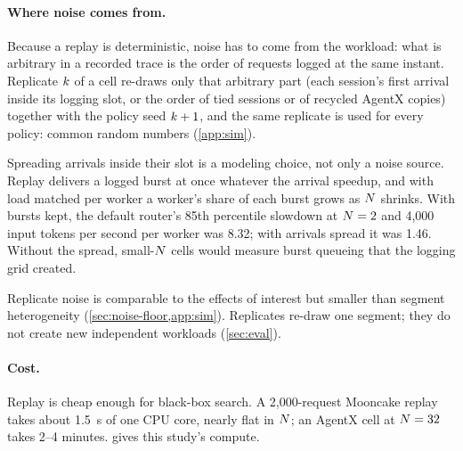 \paragraph{Where noise comes from.}
Because a replay is deterministic, noise has to come from the workload: what is arbitrary in a
recorded trace is the order of requests logged at the same instant. Replicate $k$ of a cell
re-draws only that arbitrary part (each session's first arrival inside its logging slot, or the
order of tied sessions or of recycled AgentX copies) together with the policy seed $k + 1$,
and the same replicate is used for every policy: common random numbers (\cref{app:sim}).

Spreading arrivals inside their slot is a modeling choice, not only a noise source. Replay
delivers a logged burst at once whatever the arrival speedup, and with load matched per worker a
worker's share of each burst grows as $N$ shrinks. With bursts kept, the default router's 85th
percentile slowdown at $N = 2$ and 4,000 input tokens per second per worker was 8.32; with
arrivals spread it was 1.46. Without the spread, small-$N$ cells would measure burst queueing
that the logging grid created.

Replicate noise is comparable to the effects of interest but smaller than segment heterogeneity
(\cref{sec:noise-floor,app:sim}). Replicates re-draw one segment; they do not create new
independent workloads (\cref{sec:eval}).

\paragraph{Cost.}
Replay is cheap enough for black-box search. A 2,000-request Mooncake replay takes about
\SI{1.5}{s} of one CPU core, nearly flat in $N$; an AgentX cell at $N = 32$ takes 2--4
minutes.  gives this study's compute.

